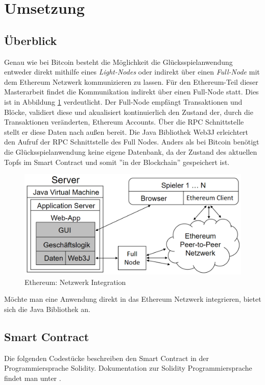 \section{Umsetzung}
\subsection{Überblick}
Genau wie bei Bitcoin besteht die Möglichkeit die Glücksspielanwendung entweder direkt mithilfe eines \textit{Light-Nodes} oder indirekt über einen \textit{Full-Node} mit dem Ethereum Netzwerk kommunizieren zu lassen. Für den Ethereum-Teil dieser Masterarbeit findet die Kommunikation indirekt über einen Full-Node statt. Dies ist in Abbildung \ref{fig:eth_anwendung_aufbau} verdeutlicht. Der Full-Node empfängt Transaktionen und Blöcke, validiert diese und akualisiert kontinuierlich den Zustand der, durch die Transaktionen veränderten, Ethereum Accounts. Über die RPC Schnittstelle stellt er diese Daten nach außen bereit. Die Java Bibliothek Web3J \cite{web3j} erleichtert den Aufruf der RPC Schnittstelle des Full Nodes. Anders als bei Bitcoin benötigt die Glücksspielanwendung keine eigene Datenbank, da der Zustand des aktuellen Topfs im Smart Contract und somit ''in der Blockchain'' gespeichert ist.
\begin{figure}[H]
\centering
\includegraphics[width=1\linewidth]{Figures/umsetzung_eth/anwendung_aufbau}
\decoRule
\caption{Ethereum: Netzwerk Integration}
\label{fig:eth_anwendung_aufbau}
\end{figure}

Möchte man eine Anwendung direkt in das Ethereum Netzwerk integrieren, bietet sich die Java Bibliothek  \cite{ethereumj} an. 

\subsection{Smart Contract}\label{eth_smart_contract}
Die folgenden Codestücke beschreiben den  Smart Contract in der Programmiersprache Solidity. Dokumentation zur Solidity Programmiersprache findet man unter \cite{doc_solidity}.

